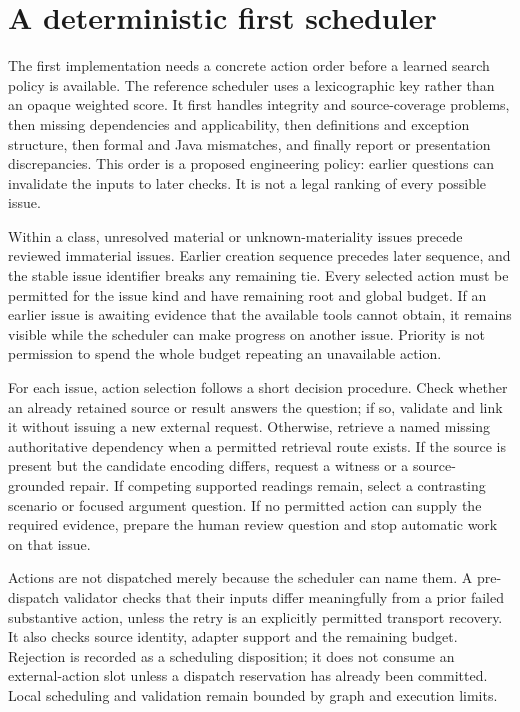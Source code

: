 \documentclass[12pt,a4paper,oneside,openany]{book}
\begin{document}
\section{A deterministic first scheduler}

The first implementation needs a concrete action order before a learned search
policy is available. The reference scheduler uses a lexicographic key rather
than an opaque weighted score. It first handles integrity and source-coverage
problems, then missing dependencies and applicability, then definitions and
exception structure, then formal and Java mismatches, and finally report or
presentation discrepancies. This order is a proposed engineering policy: earlier
questions can invalidate the inputs to later checks. It is not a legal ranking
of every possible issue.

Within a class, unresolved material or unknown-materiality issues precede reviewed
immaterial issues. Earlier creation sequence precedes later sequence, and the
stable issue identifier breaks any remaining tie. Every selected action must be
permitted for the issue kind and have remaining root and global budget. If an
earlier issue is awaiting evidence that the available tools cannot obtain, it
remains visible while the scheduler can make progress on another issue. Priority
is not permission to spend the whole budget repeating an unavailable action.

For each issue, action selection follows a short decision procedure. Check whether
an already retained source or result answers the question; if so, validate and
link it without issuing a new external request. Otherwise, retrieve a named
missing authoritative dependency when a permitted retrieval route exists. If the
source is present but the candidate encoding differs, request a witness or a
source-grounded repair. If competing supported readings remain, select a
contrasting scenario or focused argument question. If no permitted action can
supply the required evidence, prepare the human review question and stop automatic
work on that issue.

Actions are not dispatched merely because the scheduler can name them. A
pre-dispatch validator checks that their inputs differ meaningfully from a prior
failed substantive action, unless the retry is an explicitly permitted transport
recovery. It also checks source identity, adapter support and the remaining
budget. Rejection is recorded as a scheduling disposition; it does not consume
an external-action slot unless a dispatch reservation has already been committed.
Local scheduling and validation remain bounded by graph and execution limits.
\end{document}
